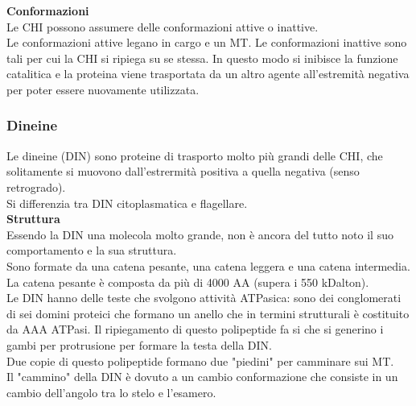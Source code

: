             \textbf{Conformazioni}\\
                Le CHI possono assumere delle conformazioni attive o inattive.\\
                Le conformazioni attive legano in cargo e un MT.
                Le conformazioni inattive sono tali per cui la CHI si ripiega su se stessa. In questo modo si inibisce la funzione catalitica e la proteina viene trasportata da un altro agente all'estremità negativa per poter essere nuovamente utilizzata.
            
        \subsubsection{Dineine}
            Le dineine (DIN) sono proteine di trasporto molto più grandi delle CHI, che solitamente si muovono dall'estrermità positiva a quella negativa (senso retrogrado). \\
            Si differenzia tra DIN citoplasmatica e flagellare.\\
            
            \textbf{Struttura}\\
                Essendo la DIN una molecola molto grande, non è ancora del tutto noto il suo comportamento e la sua struttura.\\
                Sono formate da una catena pesante, una catena leggera e una catena intermedia. La catena pesante è composta da più di 4000 AA (supera i 550 kDalton).\\
                Le DIN hanno delle teste che svolgono attività ATPasica: sono dei conglomerati di sei domini proteici che formano un anello che in termini strutturali è costituito da AAA ATPasi. Il ripiegamento di questo polipeptide fa si che si generino i gambi per protrusione per formare la testa della DIN.\\ 
                Due copie di questo polipeptide formano due "piedini" per camminare sui MT.\\
                Il "cammino" della DIN è dovuto a un cambio conformazione che consiste in un cambio dell'angolo tra lo stelo e l'esamero.\\
                
